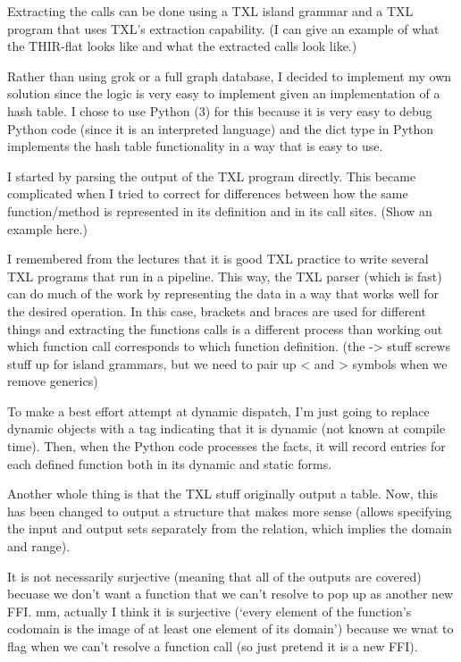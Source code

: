 \documentclass[11pt]{article}
\begin{document}
Extracting the calls can be done using a TXL island grammar and a TXL program that uses TXL's extraction capability.
(I can give an example of what the THIR-flat looks like and what the extracted calls look like.)

Rather than using grok or a full graph database, I decided to implement my own solution since the logic is very easy to implement given an implementation of a hash table.
I chose to use Python (3) for this because it is very easy to debug Python code (since it is an interpreted language) and the dict type in Python implements the hash table functionality in a way that is easy to use.

I started by parsing the output of the TXL program directly.
This became complicated when I tried to correct for differences between how the same function/method is represented in its definition and in its call sites.
(Show an example here.)

I remembered from the lectures that it is good TXL practice to write several TXL programs that run in a pipeline.
This way, the TXL parser (which is fast) can do much of the work by representing the data in a way that works well for the desired operation.
In this case, brackets and braces are used for different things and extracting the functions calls is a different process than working out which function call corresponds to which function definition.
(the -> stuff screws stuff up for island grammars, but we need to pair up < and > symbols when we remove generics)

To make a best effort attempt at dynamic dispatch, I'm just going to replace dynamic objects with a tag indicating that it is dynamic (not known at compile time).
Then, when the Python code processes the facts, it will record entries for each defined function both in its dynamic and static forms.

Another whole thing is that the TXL stuff originally output a table.
Now, this has been changed to output a structure that makes more sense (allows specifying the input and output sets separately from the relation, which implies the domain and range).

It is not necessarily surjective (meaning that all of the outputs are covered) becuase we don't want a function that we can't resolve to pop up as another new FFI.
mm, actually I think it is surjective (`every element of the function's codomain is the image of at least one element of its domain') because we wnat to flag when we can't resolve a function call (so just pretend it is a new FFI).
\end{document}
